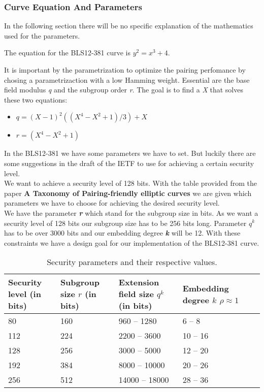 \documentclass{article}
\begin{document}
\subsubsection{Curve Equation And Parameters}
In the following section there will be no specific explanation of the mathematics used for the parameters. \newline
\begin{center}
The equation for the BLS12-381 curve is \(y^2=x^3+4\). \\
\end{center}
It is important by the parametrization to optimize the pairing perfomance by chosing a parametrizaction with a low Hamming weight. Essential are the base field modulus \textit{q} and the subgroup order \textit{r}. The goal is to find a \textit{X} that solves these two equations:
\begin{center}
\begin{itemize}
    \item \(q = (X -1)^2((X^4 -X^2+1)/3) + X\)
    \item \(r = (X^4-X^2+1)\)
\end{itemize}
\end{center}
In the BLS12-381 we have some parameters we have to set. But luckily there are some suggestions in the draft of the IETF to use for achieving a certain security level. \\
We want to achieve a security level of 128 bits. With the table provided from the paper \textbf{A Taxonomy of Pairing-friendly elliptic curves} we are given which parameters we have to choose for achieving the desired security level.\\
We have the parameter \textbf{\textit{r}} which stand for the subgroup size in bits. As we want a security level of 128 bits our subgroup size has to be 256 bits long. Parameter \textbf{\textit{\(q^k\)}} has to be over 3000 bits and our embedding degree \textbf{\textit{k}} will be 12. With these constraints we have a design goal for our implementation of the BLS12-381 curve. \\
\begin{table}[h!]
    \centering
    \begin{tabularx}{\textwidth}{lXXXXX}
        \toprule
        Security level (in bits) & Subgroup size $r$ (in bits) & Extension field size $q^k$ (in bits) & Embedding degree $k$ $\rho \approx 1$  \\
        \midrule
        80  & 160 & 960 -- 1280  & 6 -- 8   \\
        112 & 224 & 2200 -- 3600 & 10 -- 16  \\
        128 & 256 & 3000 -- 5000 & 12 -- 20  \\
        192 & 384 & 8000 -- 10000& 20 -- 26  \\
        256 & 512 & 14000 -- 18000&28 -- 36  \\
        \bottomrule
    \end{tabularx}
    \caption{Security parameters and their respective values.}
\end{table}
\end{document}
